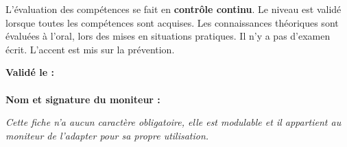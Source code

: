 L'évaluation des compétences se fait en \textbf{contrôle continu}. Le niveau est validé
lorsque toutes les compétences sont acquises. Les connaissances théoriques sont évaluées à
l'oral, lors des mises en situations pratiques. Il n'y a pas d'examen écrit. L'accent est mis
sur la prévention.

\vspace{0.5cm}
\textbf{Validé le :} \makebox[6cm]{\hrulefill} \hfill \\
\\
\textbf{Nom et signature du moniteur :} \makebox[6cm]{\hrulefill}
\vspace{0.5cm}

{\small\itshape Cette fiche n'a aucun caractère obligatoire, elle est modulable et il
appartient au moniteur de l'adapter pour sa propre utilisation.}

\addtocounter{seanceoffset}{8}